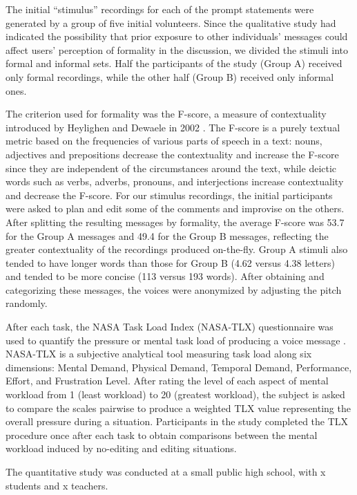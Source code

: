 The initial ``stimulus'' recordings for each of the prompt statements were generated by a group of five initial volunteers. 
Since the qualitative study had indicated the possibility that prior exposure to other individuals' messages could affect users' perception of formality in the discussion, we divided the stimuli into formal and informal sets. 
Half the participants of the study (Group A) received only formal recordings, while the other half (Group B) received only informal ones.

The criterion used for formality was the F-score, a measure of contextuality introduced by Heylighen and Dewaele in 2002 \cite{heylighen}.
The F-score is a purely textual metric based on the frequencies of various parts of speech in a text: nouns, adjectives and prepositions decrease the contextuality and increase the F-score since they are independent of the circumstances around the text, while deictic words such as verbs, adverbs, pronouns, and interjections increase contextuality and decrease the F-score. 
For our stimulus recordings, the initial participants were asked to plan and edit some of the comments and improvise on the others.
After splitting the resulting messages by formality, the average F-score was 53.7 for the Group A messages and 49.4 for the Group B messages, reflecting the greater contextuality of the recordings produced on-the-fly.
Group A stimuli also tended to have longer words than those for Group B (4.62 versus 4.38 letters) and tended to be more concise (113 versus 193 words).
After obtaining and categorizing these messages, the voices were anonymized by adjusting the pitch randomly.

After each task, the NASA Task Load Index (NASA-TLX) questionnaire was used to quantify the pressure or mental task load of producing a voice message \cite{nasatlx}. 
NASA-TLX is a subjective analytical tool measuring task load along six dimensions: Mental Demand, Physical Demand, Temporal Demand, Performance, Effort, and Frustration Level. 
After rating the level of each aspect of mental workload from 1 (least workload) to 20 (greatest workload), the subject is asked to compare the scales pairwise to produce a weighted TLX value representing the overall pressure during a situation. 
Participants in the study completed the TLX procedure once after each task to obtain comparisons between the mental workload induced by no-editing and editing situations.

The quantitative study was conducted at a small public high school, with x students and x teachers.

